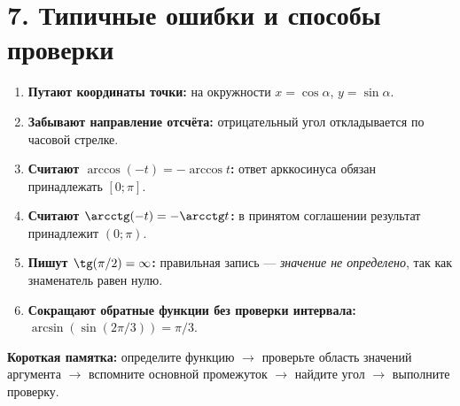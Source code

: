 \documentclass[a4paper,12pt]{article}
\newcommand{\sectionline}{\par\vspace{-2mm}{\color{accent}\rule{\linewidth}{0.35pt}}\par\vspace{2mm}}
\newcommand{\topic}[1]{\section*{\normalfont\color{darkaccent}#1}\sectionline}
\begin{document}
\topic{7. Типичные ошибки и способы проверки}
\begin{enumerate}[label=\textcolor{accent}{\arabic*.},itemsep=4pt]
\item \textbf{Путают координаты точки:} на окружности $x=\cos\alpha$, $y=\sin\alpha$.
\item \textbf{Забывают направление отсчёта:} отрицательный угол откладывается по часовой стрелке.
\item \textbf{Считают $\arccos(-t)=-\arccos t$:} ответ арккосинуса обязан принадлежать $[0;\pi]$.
\item \textbf{Считают $\arcctg(-t)=-\arcctg t$:} в принятом соглашении результат принадлежит $(0;\pi)$.
\item \textbf{Пишут $\tg(\pi/2)=\infty$:} правильная запись --- \emph{значение не определено}, так как знаменатель равен нулю.
\item \textbf{Сокращают обратные функции без проверки интервала:} $\arcsin(\sin(2\pi/3))=\pi/3$.
\end{enumerate}
\textbf{Короткая памятка:} определите функцию $\rightarrow$ проверьте область значений аргумента $\rightarrow$ вспомните основной промежуток $\rightarrow$ найдите угол $\rightarrow$ выполните проверку.
\end{document}
